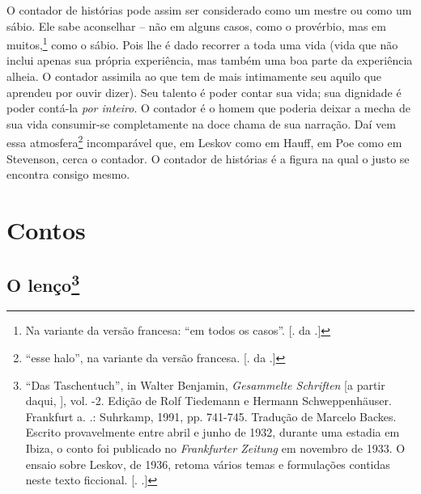O contador de histórias pode assim ser considerado como um mestre ou
como um sábio. Ele sabe aconselhar -- não em alguns casos, como o
provérbio, mas em muitos,\footnote{Na variante da versão francesa: ``em
  todos os casos''. [. da .]} como o sábio. Pois lhe é dado
recorrer a toda uma vida (vida que não inclui apenas sua própria
experiência, mas também uma boa parte da experiência alheia. O contador
assimila ao que tem de mais intimamente seu aquilo que aprendeu por
ouvir dizer). Seu talento é poder contar sua vida; sua dignidade é poder
contá-la \emph{por inteiro}. O contador é o homem que poderia deixar a
mecha de sua vida consumir-se completamente na doce chama de sua
narração. Daí vem essa atmosfera\footnote{``esse halo'', na variante da
  versão francesa. [. da .]} incomparável que, em Leskov como em
Hauff, em Poe como em Stevenson, cerca o contador. O contador de
histórias é a figura na qual o justo se encontra consigo mesmo\label{supra4}.

\part{Contos}

\chapter{O lenço\footnote[*]{``Das Taschentuch'', in Walter Benjamin,
  \emph{Gesammelte Schriften} [a partir daqui, ], vol. -2.
  Edição de Rolf Tiedemann e Hermann Schweppenhäuser. Frankfurt a. .:
  Suhrkamp, 1991, pp. 741-745. Tradução de Marcelo Backes. Escrito
  provavelmente entre abril e junho de 1932, durante uma estadia em
  Ibiza, o conto foi publicado no \emph{Frankfurter Zeitung} em novembro
  de 1933. O ensaio sobre Leskov, de 1936, retoma vários temas e
  formulações contidas neste texto ficcional. [. .]}}

